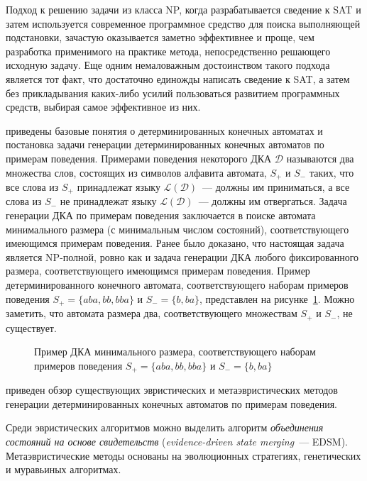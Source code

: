 Подход к решению задачи из класса NP, когда разрабатывается сведение к SAT и затем используется современное программное средство для поиска выполняющей подстановки, зачастую оказывается заметно эффективнее и проще, чем разработка применимого на практике метода, непосредственно решающего исходную задачу.
Еще одним немаловажным достоинством такого подхода является тот факт, что достаточно единожды написать сведение к SAT, а затем без прикладывания каких-либо усилий пользоваться развитием программных средств, выбирая самое эффективное из них.

\insection{\ref{sec:review:dfa-inf}} приведены базовые понятия о детерминированных конечных автоматах и постановка задачи генерации детерминированных конечных автоматов по примерам поведения. 
Примерами поведения некоторого ДКА $\mathcal{D}$ называются два множества слов, состоящих из символов алфавита автомата, $S_{+}$ и $S_{-}$ таких, что все слова из $S_{+}$ принадлежат языку $\mathcal{L}\left(\mathcal{D}\right)$~--- должны им приниматься, а все слова из $S_{-}$ не принадлежат языку $\mathcal{L}\left(\mathcal{D}\right)$~--- должны им отвергаться.
Задача генерации ДКА по примерам поведения заключается в поиске автомата минимального размера (с минимальным числом состояний), соответствующего имеющимся примерам поведения.
Ранее было доказано, что настоящая задача является NP-полной, ровно как и задача генерации ДКА любого фиксированного размера, соответствующего имеющимся примерам поведения.
Пример детерминированного конечного автомата, соответствующего наборам примеров поведения $S_{+} = \{aba, bb, bba\}$ и $S_{-} = \{b, ba\}$, представлен на рисунке~\ref{syn:img:dfa-ex}.
Можно заметить, что автомата размера два, соответствующего множествам $S_{+}$ и $S_{-}$, не существует.

\begin{figure}[ht]
  \centering
  \ifafour
    
  \else
    
  \fi
  \caption{Пример ДКА минимального размера, соответствующего наборам примеров поведения $S_{+} = \{aba, bb, bba\}$ и $S_{-} = \{b, ba\}$}
  \label{syn:img:dfa-ex}
\end{figure}


\insection{\ref{sec:review:heuristic-dfa-inf}} приведен обзор существующих эвристических и метаэвристических методов генерации детерминированных конечных автоматов по примерам поведения. 

Среди эвристических алгоритмов можно выделить алгоритм \emph{объединения состояний на основе свидетельств} (\emph{evidence-driven state merging}~--- EDSM).
Метаэвристические методы основаны на эволюционных стратегиях, генетических и муравьиных алгоритмах.

